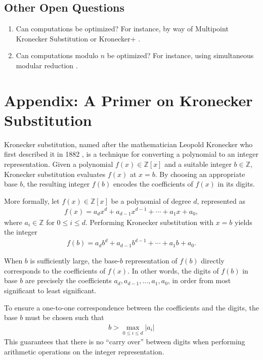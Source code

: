 \documentclass[11pt,reqno]{article}
\theoremstyle{plain}
\theoremstyle{definition}
\begin{document}
\subsection{Other Open Questions}
\begin{enumerate}
    \item Can computations be optimized? For instance, by way of Multipoint Kronecker Substitution \cite{harvey2009kronecker} or Kronecker+ \cite{bos2020postquantum}.
    \item Can computations modulo $n$ be optimized? For instance, using simultaneous modular reduction \cite{dumas2011simulataneous}.
\end{enumerate}

\newpage
\section{Appendix: A Primer on Kronecker Substitution} \label{section:kronecker}
Kronecker substitution, named after the mathematician Leopold Kronecker who first described it in 1882 \cite{kronecker1882}, is a technique for converting a polynomial to an integer representation. Given a polynomial $f(x) \in \mathbb{Z}[x]$ and a suitable integer $b \in \mathbb{Z}$, Kronecker substitution evaluates $f(x)$ at $x = b$. By choosing an appropriate base $b$, the resulting integer $f(b)$ encodes the coefficients of $f(x)$ in its digits.

More formally, let $f(x) \in \mathbb{Z}[x]$ be a polynomial of degree $d$, represented as
\begin{align*}
f(x) = a_d x^d + a_{d-1} x^{d-1} + \cdots + a_1 x + a_0,
\end{align*}
where $a_i \in \mathbb{Z}$ for $0 \leq i \leq d$. Performing Kronecker substitution with $x = b$ yields the integer
\begin{align*}
f(b) = a_d b^d + a_{d-1} b^{d-1} + \cdots + a_1 b + a_0.
\end{align*}

When $b$ is sufficiently large, the base-$b$ representation of $f(b)$ directly corresponds to the coefficients of $f(x)$. In other words, the digits of $f(b)$ in base $b$ are precisely the coefficients $a_d, a_{d-1}, \ldots, a_1, a_0$, in order from most significant to least significant.

To ensure a one-to-one correspondence between the coefficients and the digits, the base $b$ must be chosen such that
\begin{align*}
    b > \max_{0 \leq i \leq d} |a_i|
\end{align*}
This guarantees that there is no ``carry over'' between digits when performing arithmetic operations on the integer representation.
\end{document}
